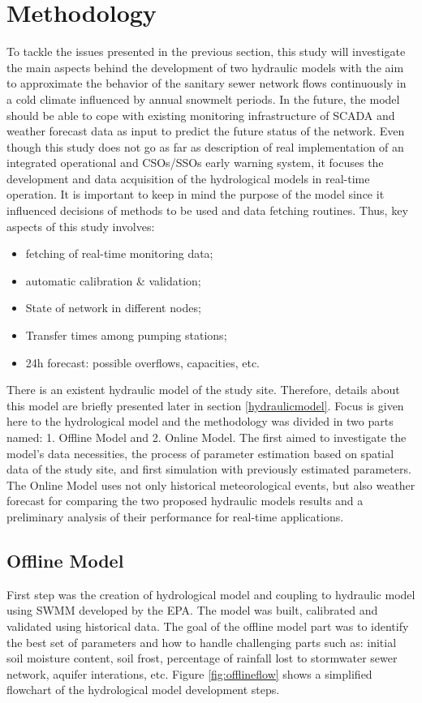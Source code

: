 \chapter{Methodology}

To tackle the issues presented in the previous section, this study will investigate the main aspects behind the development of two hydraulic models with the aim to approximate the behavior of the sanitary sewer network flows continuously in a cold climate influenced by annual snowmelt periods. In the future, the model should be able to cope with existing monitoring infrastructure of \acf{SCADA} and weather forecast data as input to predict the future status of the network. Even though this study does not go as far as description of real implementation of an integrated operational and CSOs/SSOs early warning system, it focuses the development and data acquisition of the hydrological models in real-time operation. It is important to keep in mind the purpose of the model since it influenced decisions of methods to be used and data fetching routines. Thus, key aspects of this study involves:
\begin{itemize}
    \item fetching of real-time monitoring data;
    \item automatic calibration \& validation;
    \item State of network in different nodes;
    \item Transfer times among pumping stations;
    \item 24h forecast: possible overflows, capacities, etc.
\end{itemize}

There is an existent hydraulic model of the study site. Therefore, details about this model are briefly presented later in section \ref{hydraulicmodel}.
Focus is given here to the hydrological model and the methodology was divided in two parts named: 1. Offline Model and 2. Online Model. The first aimed to investigate the model's data necessities, the process of parameter estimation based on spatial data of the study site, and first simulation with previously estimated parameters. The Online Model uses not only historical meteorological events, but also weather forecast for comparing the two proposed hydraulic models results and a preliminary analysis of their performance for real-time applications. 

\section{Offline Model}
First step was the creation of hydrological model and coupling to hydraulic model using \acf{SWMM} developed by the \acf{EPA}. The model was built, calibrated and validated using historical data. The goal of the offline model part was to identify the best set of parameters and how to handle challenging parts such as: initial soil moisture content, soil frost, percentage of rainfall lost to stormwater sewer network, aquifer interations, etc. Figure \ref{fig:offlineflow} shows a simplified flowchart of the hydrological model development steps.


